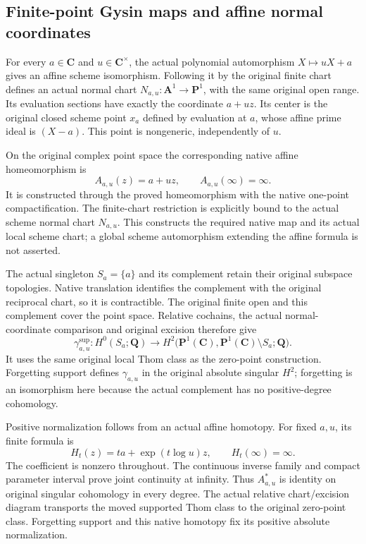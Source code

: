 \documentclass[11pt]{article}
\theoremstyle{definition}
\theoremstyle{remark}
\newcommand{\Q}{\mathbf Q}
\begin{document}
\subsection{Finite-point Gysin maps and affine normal coordinates}
\label{subsec:p1-finite-point-gysin}

For every \(a\in\mathbf C\) and \(u\in\mathbf C^\times\), the actual
polynomial automorphism \(X\mapsto uX+a\) gives an affine scheme
isomorphism. Following it by the original finite chart defines an
actual normal chart \(N_{a,u}:\mathbf A^1\to\mathbf P^1\), with the
same original open range. Its evaluation sections have exactly the
coordinate \(a+uz\). Its center is the original closed scheme point
\(x_a\) defined by evaluation at \(a\), whose affine prime ideal is
\((X-a)\). This point is nongeneric, independently of \(u\).

On the original complex point space the corresponding native affine
homeomorphism is
\[
 A_{a,u}(z)=a+uz,\qquad A_{a,u}(\infty)=\infty.
\]
It is constructed through the proved homeomorphism with the native
one-point compactification. The finite-chart restriction is explicitly
bound to the actual scheme normal chart \(N_{a,u}\). This constructs
the required native map and its actual local scheme chart; a global
scheme automorphism extending the affine formula is not asserted.

The actual singleton \(S_a=\{a\}\) and its complement retain their
original subspace topologies. Native translation identifies the
complement with the original reciprocal chart, so it is contractible.
The original finite open and this complement cover the point space.
Relative cochains, the actual normal-coordinate comparison and
original excision therefore give
\[
 \gamma^{\mathrm{sup}}_{a,u}:H^0(S_a;\Q)
       \longrightarrow
       H^2\bigl(\mathbf P^1(\mathbf C),
                   \mathbf P^1(\mathbf C)\setminus S_a;\Q\bigr).
\]
It uses the same original local Thom class as the zero-point
construction. Forgetting support defines \(\gamma_{a,u}\) in the
original absolute singular \(H^2\); forgetting is an isomorphism here
because the actual complement has no positive-degree cohomology.

Positive normalization follows from an actual affine homotopy. For
fixed \(a,u\), its finite formula is
\[
 H_t(z)=ta+\exp(t\log u)z,\qquad H_t(\infty)=\infty.
\]
The coefficient is nonzero throughout. The continuous inverse family
and compact parameter interval prove joint continuity at infinity.
Thus \(A_{a,u}^*\) is identity on original singular cohomology in
every degree. The actual relative chart/excision diagram transports
the moved supported Thom class to the original zero-point class.
Forgetting support and this native homotopy fix its positive absolute
normalization.
\end{document}
